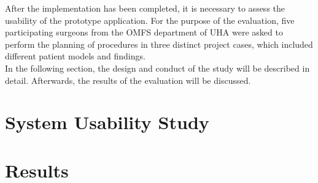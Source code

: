 After the implementation has been completed, it is necessary to assess the usability of the prototype application.
For the purpose of the evaluation, five participating surgeons from the OMFS department of UHA were asked to perform the planning of procedures in three distinct project cases, which included different patient models and findings.
\\ In the following section, the design and conduct of the study will be described in detail.
Afterwards, the results of the evaluation will be discussed. 

\section{\label{sec::Methology}System Usability Study}

\section{\label{sec::Results}Results}
